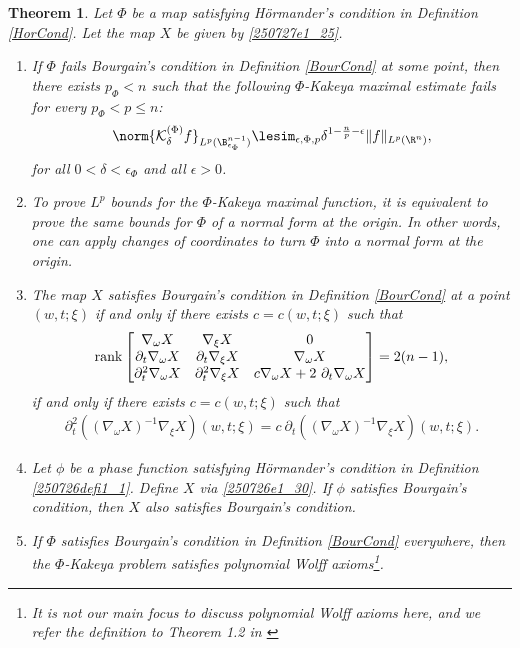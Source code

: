 \documentclass{article}
\numberwithin{equation}{section}
\theoremstyle{plain}
\newtheorem{theorem}{Theorem}[section]
\begin{document}
\begin{theorem}\label{250727theorem1_13}
 Let $\Phi$ be a map satisfying H\"ormander's condition in Definition \ref{HorCond}. Let the map $X$ be given by \eqref{250727e1_25}. 
\begin{enumerate}
\item\label{thm1_13item1} If $\Phi$ fails Bourgain's condition in Definition \ref{BourCond} at some point, then there exists $p_{\Phi}< n$ such that the following $\Phi$-Kakeya maximal estimate fails for every $p_{\Phi}< p\le n$: 
\begin{equation}\label{250726e1_14zzz}
\norm{
\mathcal{K}^{(\Phi)}_{\delta} f
}_{L^p(
\B^{n-1}_{\epsilon_{\Phi}}
)}
\lesim_{\epsilon, \Phi, p}
\delta^{1-\frac{n}{p}-\epsilon} \|f\|_{L^p(\R^n)},
\end{equation}
for all $0<\delta< \epsilon_{\Phi}$ and all $\epsilon>0$.

\item\label{thm1_13item2} To prove $L^p$ bounds for the $\Phi$-Kakeya maximal function, it is equivalent to prove the same bounds for $\Phi$ of a normal form at the origin. In other words, one can apply changes of coordinates to turn $\Phi$ into a normal form at the origin.  

\item\label{thm1_13item3} The map $X$ satisfies Bourgain's condition in Definition \ref{BourCond} at a point $(w,t ; \xi)$ if and only if there exists $c=c(w, t; \xi)$ such that 
\begin{align}\label{25100e1_35ddd}
		 {\rm rank}\begin{bmatrix}
				\nabla_\omega X & \nabla_\xi X  & 0  \\
				\partial_t\nabla_\omega X & \partial_t\nabla_\xi X & \nabla_\omega X  \\
				\partial_t^2\nabla_\omega X & \partial_t^2\nabla_\xi X  
				& c \nabla_\omega X+ 2\ \partial_t\nabla_\omega X 
			\end{bmatrix} = 2(n-1),
		\end{align}
if and only if there exists $c=c(w, t; \xi)$ such that 
    \begin{align}\label{260615e1_37}
        \partial_t^2( (\nabla_\omega X)^{-1} \nabla_\xi X)(w,t;\xi) = c\  \partial_t( (\nabla_\omega X)^{-1} \nabla_\xi X)(w,t;\xi).
    \end{align}


\item\label{thm1_13item4} Let $\phi$ be a phase function satisfying H\"ormander's condition in Definition \ref{250726defi1_1}. Define $X$ via \eqref{250726e1_30}. 
If $\phi$ satisfies Bourgain's condition, then $X$ also satisfies Bourgain's condition.  

\item\label{thm1_13item5} 
If $\Phi$ satisfies Bourgain's condition in Definition \ref{BourCond} everywhere, then the $\Phi$-Kakeya problem satisfies polynomial Wolff axioms\footnote{
It is not our main focus to discuss polynomial Wolff axioms here, and we refer the definition to Theorem 1.2 in \cite{GWZ24}
}.
\end{enumerate}

\end{theorem}
\end{document}
